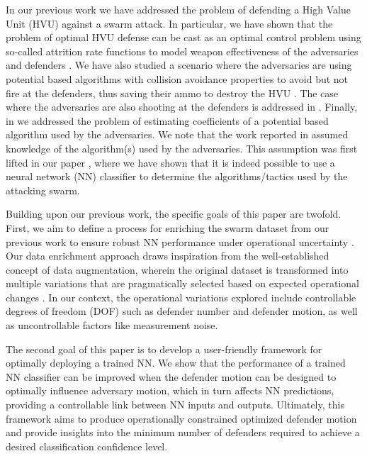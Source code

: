 \documentclass[journal]{IEEEtran} %
\begin{document}
In our previous work we have addressed the problem of  defending a High Value Unit (HVU) against a swarm attack. In particular, we have shown that the problem of optimal HVU defense can be cast as an optimal control problem using so-called attrition rate functions to model weapon effectiveness of the adversaries and defenders \cite{walton_optimal_2018}. We have also studied a scenario where the adversaries are using potential based algorithms with collision avoidance properties to avoid but not fire at the defenders, thus saving their ammo to destroy the HVU \cite{walton_defense_2022}. The case where the adversaries are also shooting at the defenders is addressed in \cite{tsatsanifos_modeling_2021}. Finally, in \cite{gong_partial_2020} we addressed the problem of estimating coefficients of a potential based algorithm used by the adversaries. We note that the work reported in \cite{walton_optimal_2018,walton_defense_2022,tsatsanifos_modeling_2021,gong_partial_2020} assumed knowledge of the algorithm(s) used by the adversaries. This assumption was first lifted in our paper  \cite{peltier_swarm_2024}, where we have shown that it is indeed possible to use a neural network (NN) classifier to determine the algorithms/tactics used by the attacking swarm.

Building upon our previous work, the specific goals of this paper are twofold. First, we aim to define a process for enriching the swarm dataset from our previous work to ensure robust NN performance under operational uncertainty \cite{peltier_swarm_2024}. Our data enrichment approach draws inspiration from the well-established concept of data augmentation, wherein the original dataset is transformed into multiple variations that are pragmatically selected based on expected operational changes \cite{gao_data_2024, iglesias_data_2023}. In our context, the operational variations explored include controllable degrees of freedom (DOF) such as defender number and defender motion, as well as uncontrollable factors like measurement noise.

The second goal of this paper is to develop a user-friendly framework for optimally deploying a trained NN. We show that the performance of a trained NN classifier can be improved when the defender motion can be designed to optimally influence adversary motion, which in turn affects NN predictions, providing a controllable link between NN inputs and outputs. Ultimately, this  framework aims to produce operationally constrained optimized defender motion and provide insights into the minimum number of defenders required to achieve a desired classification confidence level.
\end{document}

